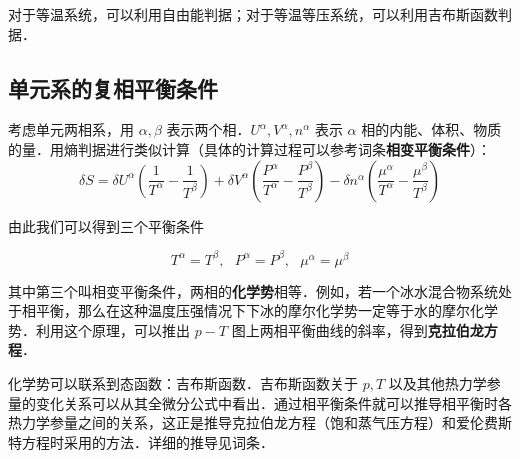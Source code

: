 对于等温系统，可以利用自由能判据；对于等温等压系统，可以利用吉布斯函数判据．

\subsection{单元系的复相平衡条件}
考虑单元两相系，用 $\alpha,\beta$ 表示两个相．$U^\alpha,V^\alpha,n^\alpha$ 表示 $\alpha$ 相的内能、体积、物质的量．用熵判据进行类似计算（具体的计算过程可以参考词条\textbf{相变平衡条件}）：
\begin{equation}
\delta S=\delta U^\alpha\left(\frac{1}{T^\alpha}-\frac{1}{T^\beta}\right)+\delta V^\alpha\left(\frac{P^\alpha}{T^\alpha}-\frac{P^\beta}{T^\beta}\right)
-\delta n^\alpha\left(\frac{\mu^\alpha}{T^\alpha}-\frac{\mu^\beta}{T^\beta}\right)
\end{equation}

由此我们可以得到三个平衡条件

\begin{equation}
T^\alpha=T^\beta,\ \ \ P^\alpha=P^\beta,\ \ \ \mu^\alpha=\mu^\beta
\end{equation}

其中第三个叫相变平衡条件，两相的\textbf{化学势}相等．例如，若一个冰水混合物系统处于相平衡，那么在这种温度压强情况下下冰的摩尔化学势一定等于水的摩尔化学势．利用这个原理，可以推出 $p-T$ 图上两相平衡曲线的斜率，得到\textbf{克拉伯龙方程}．

化学势可以联系到态函数：吉布斯函数．吉布斯函数关于 $p,T$ 以及其他热力学参量的变化关系可以从其全微分公式中看出．通过相平衡条件就可以推导相平衡时各热力学参量之间的关系，这正是推导克拉伯龙方程（饱和蒸气压方程）和爱伦费斯特方程时采用的方法．详细的推导见词条．
